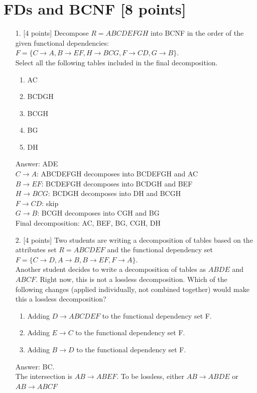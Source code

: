 \documentclass[10pt]{article}
\begin{document}
\newpage

\section{\textbf{FDs and BCNF [8 points]}}
\begin{enumerate}
    \item[1.] [4 points] Decompose $R=ABCDEFGH$ into BCNF in the order of the given functional dependencies: $F=\{ C\rightarrow A, B\rightarrow EF, H\rightarrow BCG, F\rightarrow CD, G\rightarrow B\}$.\\
    Select all the following tables included in the final decomposition.
    \begin{enumerate}
        \item AC
        \item BCDGH
        \item BCGH
        \item BG
        \item DH
    \end{enumerate}
    {\color{red} Answer: ADE\\
    $C\rightarrow A$: ABCDEFGH decomposes into BCDEFGH and AC\\
    $B\rightarrow EF$: BCDEFGH decomposes into BCDGH and BEF\\
    $H\rightarrow BCG$: BCDGH decomposes into DH and BCGH\\
    $F\rightarrow CD$: skip\\
    $G\rightarrow B$: BCGH decomposes into CGH and BG\\
    Final decomposition: AC, BEF, BG, CGH, DH}
    \item[2.] [4 points] Two students are writing a decomposition of tables based on the attributes set $R=ABCDEF$ and the functional dependency set $F=\{ C\rightarrow D, A\rightarrow B, B\rightarrow EF, F\rightarrow A \}$.\\
    Another student decides to write a decomposition of tables as $ABDE$ and $ABCF$. Right now, this is not a lossless decomposition. Which of the following changes (applied individually, not combined together) would make this a lossless decomposition?
    \begin{enumerate}
        \item Adding $D \rightarrow ABCDEF$ to the functional dependency set F.
        \item Adding $E \rightarrow C$ to the functional dependency set F.
        \item Adding $B \rightarrow D$ to the functional dependency set F.
    \end{enumerate}
     {\color{red} Answer: BC.\\
     The intersection is $AB \rightarrow ABEF$. To be lossless, either $AB \rightarrow ABDE$ or $AB \rightarrow ABCF$}
\end{enumerate}
\end{document}
